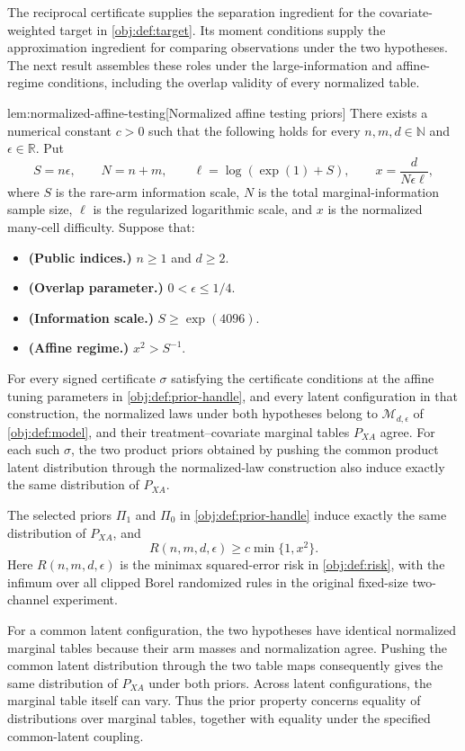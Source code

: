 The reciprocal certificate supplies the separation ingredient for the covariate-weighted target in \cref{obj:def:target}. Its moment conditions supply the approximation ingredient for comparing observations under the two hypotheses. The next result assembles these roles under the large-information and affine-regime conditions, including the overlap validity of every normalized table.

\begin{lemmav}{lem:normalized-affine-testing}[Normalized affine testing priors]
There exists a numerical constant \(c>0\) such that the following holds for every \(n,m,d\in\mathbb N\) and \(\epsilon\in\mathbb R\). Put
\[
S=n\epsilon,\qquad N=n+m,\qquad
\ell=\log(\exp(1)+S),\qquad x=\frac{d}{N\epsilon\ell},
\]
where \(S\) is the rare-arm information scale, \(N\) is the total marginal-information sample size, \(\ell\) is the regularized logarithmic scale, and \(x\) is the normalized many-cell difficulty. Suppose that:
\begin{itemize}
\item \textbf{(Public indices.)} \(n\ge1\) and \(d\ge2\).
\item \textbf{(Overlap parameter.)} \(0<\epsilon\le1/4\).
\item \textbf{(Information scale.)} \(S\ge\exp(4096)\).
\item \textbf{(Affine regime.)} \(x^2>S^{-1}\).
\end{itemize}
For every signed certificate \(\sigma\) satisfying the certificate conditions at the affine tuning parameters in \cref{obj:def:prior-handle}, and every latent configuration in that construction, the normalized laws under both hypotheses belong to \(\mathcal M_{d,\epsilon}\) of \cref{obj:def:model}, and their treatment--covariate marginal tables \(P_{XA}\) agree. For each such \(\sigma\), the two product priors obtained by pushing the common product latent distribution through the normalized-law construction also induce exactly the same distribution of \(P_{XA}\).

The selected priors \(\Pi_1\) and \(\Pi_0\) in \cref{obj:def:prior-handle} induce exactly the same distribution of \(P_{XA}\), and
\[
R(n,m,d,\epsilon)\ge c\min\{1,x^2\}.
\]
Here \(R(n,m,d,\epsilon)\) is the minimax squared-error risk in \cref{obj:def:risk}, with the infimum over all clipped Borel randomized rules in the original fixed-size two-channel experiment.
\end{lemmav}

For a common latent configuration, the two hypotheses have identical normalized marginal tables because their arm masses and normalization agree. Pushing the common latent distribution through the two table maps consequently gives the same distribution of \(P_{XA}\) under both priors. Across latent configurations, the marginal table itself can vary. Thus the prior property concerns equality of distributions over marginal tables, together with equality under the specified common-latent coupling.

